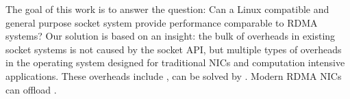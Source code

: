 



The goal of this work is to answer the question: Can a Linux compatible and general purpose socket system provide performance comparable to RDMA systems?
Our solution is based on an insight: the bulk of overheads in existing socket systems is not caused by the socket API, but multiple types of overheads in the operating system designed for traditional NICs and computation intensive applications.
These overheads include , can be solved by .
Modern RDMA NICs can offload .

